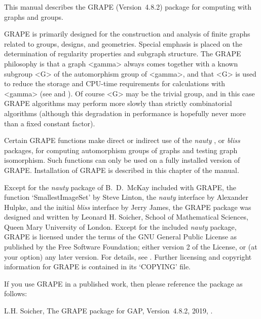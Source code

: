 %
%
%
%
\def\GRAPE{\sf GRAPE}
\def\nauty{\it nauty}
\def\bliss{\it bliss}
\def\Aut{{\rm Aut}\,} 


This manual describes the {\GRAPE} (Version~4.8.2) package for computing
with graphs and groups.

{\GRAPE} is primarily designed for the construction and analysis of
finite graphs related to groups, designs, and geometries. Special
emphasis is placed on the determination of regularity properties and
subgraph structure. The {\GRAPE} philosophy is that a graph <gamma>
always comes together with a known subgroup <G> of the automorphism
group of <gamma>, and that <G> is used to reduce the storage and
CPU-time requirements for calculations with <gamma> (see
\cite{Soi93} and \cite{Soi04}).  Of course <G> may be the trivial group,
and in this case {\GRAPE} algorithms may perform more slowly than strictly
combinatorial algorithms (although this degradation in performance is
hopefully never more than a fixed constant factor).

Certain {\GRAPE} functions make direct or indirect use of the {\nauty}
\cite{Nau90}, \cite{MP14} or {\bliss} \cite{JK07} packages, for computing
automorphism groups of graphs and testing graph isomorphism. Such functions
can only be used on a fully installed version of {\GRAPE}. Installation
of {\GRAPE} is described in this chapter of the manual.

Except for the {\nauty} package of B.~D.~McKay included with {\GRAPE},
the function `SmallestImageSet' by Steve Linton, the {\nauty} interface
by Alexander Hulpke, and the initial {\bliss} interface by Jerry James,
the {\GRAPE} package was designed and written by Leonard H. Soicher,
School of Mathematical Sciences, Queen Mary University of London.
Except for the included {\nauty} package, {\GRAPE} is licensed under the
terms of the GNU General Public License as published by the Free Software
Foundation; either version 2 of the License, or (at your option) any later
version. For details, see .
Further licensing and copyright information for {\GRAPE} is contained
in its `COPYING' file.

If you use {\GRAPE} in a published work, then please reference the
package as follows:

L.H. Soicher, The {GRAPE} package for {GAP}, Version~4.8.2, 2019,
.

